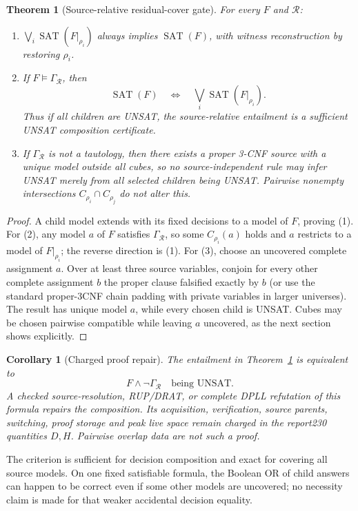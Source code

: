 \documentclass[11pt]{article}
\newtheorem{theorem}{Theorem}
\newtheorem{corollary}{Corollary}
\begin{document}
\begin{theorem}[Source-relative residual-cover gate]\label{thm:cover}
For every $F$ and $\mathcal R$:
\begin{enumerate}
\item $\bigvee_i\operatorname{SAT}(F|_{\rho_i})$ always implies
$\operatorname{SAT}(F)$, with witness reconstruction by restoring $\rho_i$.
\item If $F\models\Gamma_{\mathcal R}$, then
\[
\operatorname{SAT}(F)\quad\Longleftrightarrow\quad
\bigvee_i\operatorname{SAT}(F|_{\rho_i}).
\]
Thus if all children are UNSAT, the source-relative entailment is a sufficient
UNSAT composition certificate.
\item If $\Gamma_{\mathcal R}$ is not a tautology, then there exists a proper
3-CNF source with a unique model outside all cubes, so no source-independent
rule may infer UNSAT merely from all selected children being UNSAT.
Pairwise nonempty intersections $C_{\rho_i}\cap C_{\rho_j}$ do not alter this.
\end{enumerate}
\end{theorem}
\begin{proof}
A child model extends with its fixed decisions to a model of $F$, proving (1).
For (2), any model $a$ of $F$ satisfies $\Gamma_{\mathcal R}$, so some
$C_{\rho_i}(a)$ holds and $a$ restricts to a model of $F|_{\rho_i}$; the reverse
direction is (1).  For (3), choose an uncovered complete assignment $a$.
Over at least three source variables, conjoin for every other complete
assignment $b$ the proper clause falsified exactly by $b$ (or use the standard
proper-3CNF chain padding with private variables in larger universes).  The
result has unique model $a$, while every chosen child is UNSAT.  Cubes may be
chosen pairwise compatible while leaving $a$ uncovered, as the next section
shows explicitly.
\end{proof}

\begin{corollary}[Charged proof repair]
The entailment in Theorem~\ref{thm:cover} is equivalent to
\[
F\wedge\neg\Gamma_{\mathcal R}\quad\text{being UNSAT}.
\]
A checked source-resolution, RUP/DRAT, or complete DPLL refutation of this
formula repairs the composition.  Its acquisition, verification, source
parents, switching, proof storage and peak live space remain charged in the
report230 quantities $D,H$.  Pairwise overlap data are not such a proof.
\end{corollary}

The criterion is sufficient for decision composition and exact for covering
all source models.  On one fixed satisfiable formula, the Boolean OR of child
answers can happen to be correct even if some other models are uncovered; no
necessity claim is made for that weaker accidental decision equality.
\end{document}
